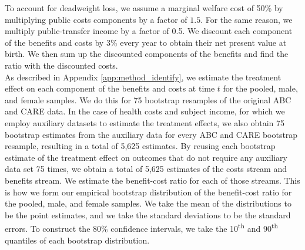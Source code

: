\noindent To account for deadweight loss, we assume a marginal welfare cost of 50\% by multiplying
public costs components by a factor of $1.5$. For the same reason, we multiply public-transfer
income by a factor of 0.5. We discount each component of the benefits and costs
by 3\% every year to obtain their net present value at birth. We then sum up the discounted
components of the benefits and find the ratio with the discounted costs. \\

\noindent As described in Appendix \ref{app:method_identify}, we estimate the treatment effect on each
component of the benefits and costs at time $t$ for the pooled, male, and
female samples. We do this for 75 bootstrap resamples of the original ABC and CARE data.
In the case of health costs and subject income, for which we employ auxiliary datasets to
estimate the treatment effects, we also obtain 75 bootstrap estimates from the auxiliary data
for every ABC and CARE bootstrap resample, resulting in a total of 5,625 estimates.
By reusing each bootstrap estimate of the treatment effect on outcomes that do not require any auxiliary data
set 75 times, we obtain a total of 5,625 estimates of the costs stream and benefits stream.
We estimate the benefit-cost ratio for each of those streams.
This is how we form our empirical bootstrap distribution of the benefit-cost ratio for the pooled, male, and female samples.
We take the mean of the distributions to be the point estimates, and we take the standard deviations
to be the standard errors. To construct the 80\% confidence intervals, we take the 10\textsuperscript{th}
and 90\textsuperscript{th} quantiles of each bootstrap distribution.




